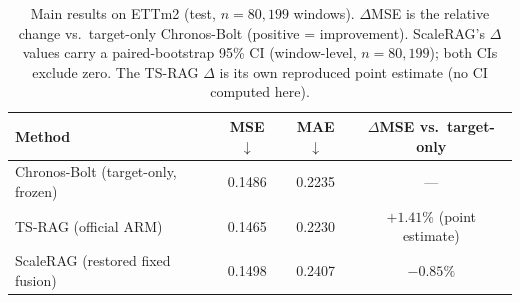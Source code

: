 \begin{table}[t]
  \centering
  \caption{Main results on ETTm2 (test, $n=80{,}199$ windows). $\Delta$MSE is the relative
    change vs.\ target-only Chronos-Bolt (positive = improvement). ScaleRAG's $\Delta$ values
    carry a paired-bootstrap 95\% CI (window-level, $n=80{,}199$); both CIs exclude zero.
    The TS-RAG $\Delta$ is its own reproduced point estimate (no CI computed here).}
  \label{tab:main-results}
  \begin{tabular}{@{}lccc@{}}
    \toprule
    Method & MSE $\downarrow$ & MAE $\downarrow$ & $\Delta$MSE vs.\ target-only \\
    \midrule
    Chronos-Bolt (target-only, frozen) & 0.1486 & 0.2235 & --- \\
    TS-RAG (official ARM)              & 0.1465 & 0.2230 & $+1.41\%$ (point estimate) \\
    ScaleRAG (restored fixed fusion)   & 0.1498 & 0.2407 & $-0.85\%$ \; [$-1.39\%$, $-0.28\%$] \\
    \bottomrule
  \end{tabular}
\end{table}
